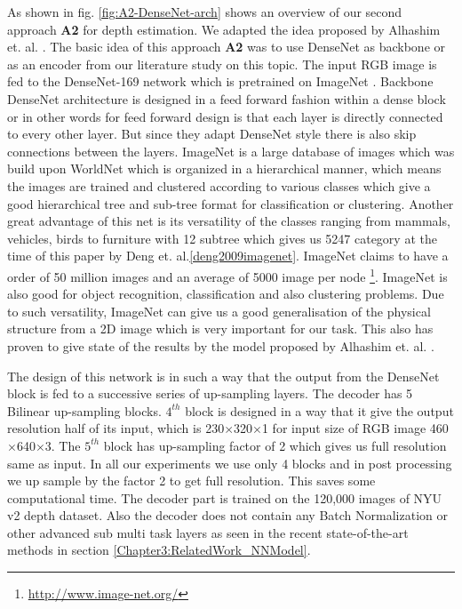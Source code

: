 As shown in fig. \ref{fig:A2-DenseNet-arch} shows an overview of our second approach \textbf{A2} for depth estimation. We adapted the idea proposed by Alhashim et. al. \cite{Alhashim2018}. The basic idea of this approach \textbf{A2} was to use DenseNet as backbone or as an encoder from our literature study on this topic. The input RGB image is fed to the DenseNet-169 \cite{huang2017densely} network which is pretrained on ImageNet \cite{deng2009imagenet}.  Backbone DenseNet architecture is designed in a feed forward fashion within a dense block or in other words for feed forward design is that each layer is directly connected to every other layer. But since they adapt DenseNet style there is also skip connections between the layers. ImageNet is a large database of images which was build upon WorldNet which is organized in a hierarchical manner, which means the images are trained and clustered according to various classes which give a good hierarchical tree and sub-tree format for classification or clustering. Another great advantage of this net is its versatility of the classes ranging from mammals, vehicles, birds to furniture with 12 subtree which gives us 5247 category at the time of this paper by Deng et. al.\ref{deng2009imagenet}. ImageNet claims to have a order of 50 million images and an average of 5000 image per node \footnote{\url{http://www.image-net.org/}}. ImageNet is also good for object recognition, classification and also clustering problems. Due to such versatility, ImageNet can give us a good generalisation of the physical structure from a 2D image which is very important for our task. This also has proven to give state of the results by the model proposed by Alhashim et. al. \cite{Alhashim2018}. 


The design of this network is in such a way that the output from the DenseNet block is  fed to a successive series of up-sampling layers. The decoder has 5 Bilinear up-sampling blocks. \(4^{th}\) block is designed in a way that it give the output resolution half of its input, which is 230$\times$320$\times$1 for input size of RGB image 460$\times$640$\times$3. The \(5^{th}\) block has up-sampling factor of 2 which gives us full resolution same as input. In all our experiments we use only 4 blocks and in post processing we up sample by the factor 2 to get full resolution. This saves some computational time. The decoder part is trained on the 120,000 images of NYU v2 depth dataset. Also the decoder does not contain any Batch Normalization or other advanced sub multi task layers as seen in the recent state-of-the-art methods in section \ref{Chapter3:RelatedWork_NNModel}.

